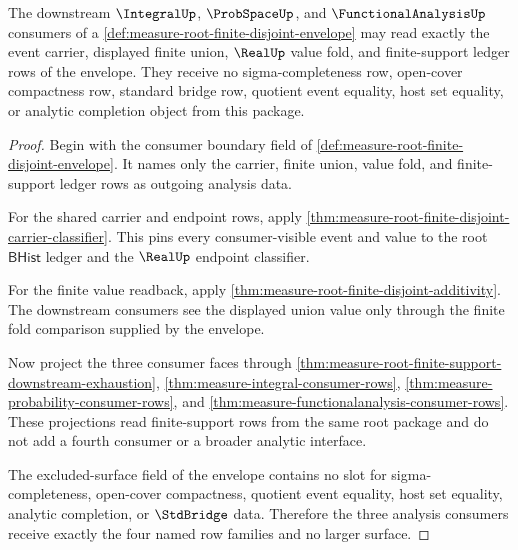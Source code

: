 \begin{theorem}
\label{thm:measure-root-finite-disjoint-consumer-threshold}
The downstream $\IntegralUp$, $\ProbSpaceUp$, and
$\FunctionalAnalysisUp$ consumers of a
\autoref{def:measure-root-finite-disjoint-envelope} may read exactly the
event carrier, displayed finite union, $\RealUp$ value fold, and
finite-support ledger rows of the envelope. They receive no
sigma-completeness row, open-cover compactness row, standard bridge row,
quotient event equality, host set equality, or analytic completion object
from this package.
\end{theorem}
\begin{proof}
Begin with the consumer boundary field of
\autoref{def:measure-root-finite-disjoint-envelope}. It names only the
carrier, finite union, value fold, and finite-support ledger rows as outgoing
analysis data.

For the shared carrier and endpoint rows, apply
\autoref{thm:measure-root-finite-disjoint-carrier-classifier}. This pins
every consumer-visible event and value to the root $\mathsf{BHist}$ ledger
and the $\RealUp$ endpoint classifier.

For the finite value readback, apply
\autoref{thm:measure-root-finite-disjoint-additivity}. The downstream
consumers see the displayed union value only through the finite fold
comparison supplied by the envelope.

Now project the three consumer faces through
\autoref{thm:measure-root-finite-support-downstream-exhaustion},
\autoref{thm:measure-integral-consumer-rows},
\autoref{thm:measure-probability-consumer-rows}, and
\autoref{thm:measure-functionalanalysis-consumer-rows}. These projections
read finite-support rows from the same root package and do not add a fourth
consumer or a broader analytic interface.

The excluded-surface field of the envelope contains no slot for
sigma-completeness, open-cover compactness, quotient event equality, host set
equality, analytic completion, or $\StdBridge$ data. Therefore the three
analysis consumers receive exactly the four named row families and no larger
surface.
\end{proof}
